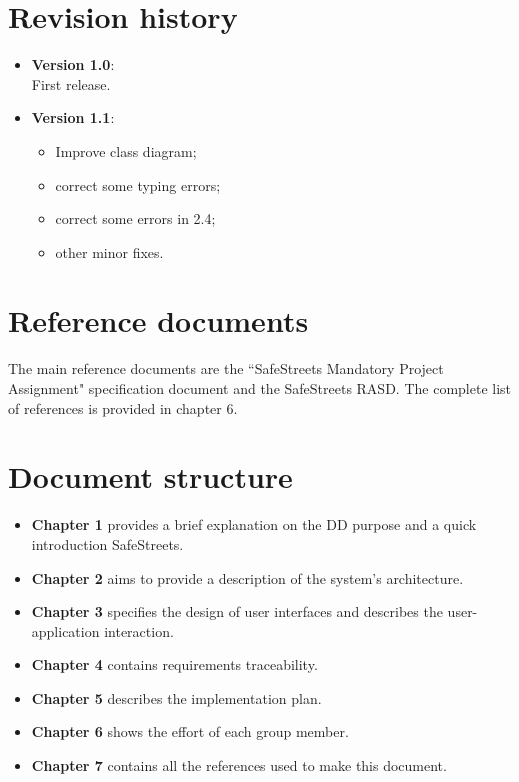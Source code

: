 \documentclass[12pt,a4paper]{report}
\begin{document}
		\section{Revision history}
			\begin{itemize}
				\item \textbf{Version 1.0}:
					\\ First release.
				\item \textbf{Version 1.1}:
				\begin{itemize}
					\item Improve class diagram;
					\item correct some typing errors;
					\item correct some errors in 2.4;
					\item other minor fixes.
				\end{itemize}
			\end {itemize}
		\section{Reference documents}
			The main reference documents are the ``SafeStreets Mandatory Project Assignment" specification document and the SafeStreets RASD. The complete list of references is provided in chapter 6.

		\section{Document structure}
			\begin{itemize}
				\item \textbf{Chapter 1} provides a brief explanation on the DD purpose and a quick introduction
					SafeStreets.
				\item \textbf{Chapter 2} aims to provide a description of the system's architecture.
				\item \textbf{Chapter 3} specifies the design of user interfaces and describes the user-application
					interaction.
				\item \textbf{Chapter 4} contains requirements traceability.
				\item \textbf{Chapter 5} describes the implementation plan.
				\item \textbf{Chapter 6} shows the effort of each group member.
				\item \textbf{Chapter 7} contains all the references used to make this document.
			\end{itemize}
\end{document}
